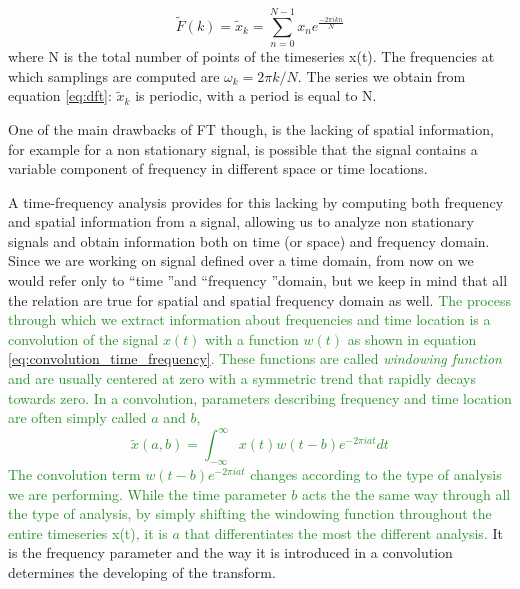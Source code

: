 \documentclass[11pt]{report}
\begin{document}
\begin{equation}\label{eq:dft}
 \tilde{F}(k) = \tilde{x}_k = \sum_{n = 0}^{N-1}x_n e^{\frac{-2\pi i k n}{N}}
\end{equation}
where N is the total number of points of the timeseries x(t).
The frequencies at which samplings are computed are $\omega_k = 2\pi k/N$.
The series we obtain from equation \ref{eq:dft}: $\tilde{x}_k$ is periodic, with a period is equal to N.

One of the main drawbacks of FT though, is the lacking of spatial information, for example for a non stationary signal, is possible that the signal contains a variable component of frequency in different space or time locations.

A time-frequency analysis provides for this lacking by computing both frequency and spatial information from a signal, allowing us to analyze non stationary signals and obtain information both on time (or space) and frequency domain.
Since we are working on signal defined over a time domain, from now on we would refer only to  \textquotedblleft time \textquotedblright  and  \textquotedblleft frequency \textquotedblright domain, but we keep in mind that all the relation are true for spatial and spatial frequency domain as well.
\textcolor{ForestGreen}{
The process through which we extract information about frequencies and time location is a convolution of the signal $x(t)$ with a function $w(t)$ as shown in equation \ref{eq:convolution_time_frequency}.
These functions are called \emph{windowing function} and are usually centered at zero with a symmetric trend that rapidly decays towards zero.
In a convolution, parameters describing frequency and time location are often simply called $a$ and $b$,
\begin{equation}\label{eq:convolution_time_frequency}
\tilde{x}(a, b) = \int_{-\infty}^{\infty} x(t)w(t-b) e^{-2\pi i a t} dt
\end{equation}
The convolution term $w(t-b) e^{-2\pi i a t}$ changes according to the type of analysis we are performing.
While the time parameter $b$ acts the the same way through all the type of analysis, by simply shifting the windowing function throughout the entire timeseries x(t), it is $a$ that differentiates the most the different analysis.
}
It is the frequency parameter and the way it is introduced in a convolution determines the developing of the transform.
\end{document}

